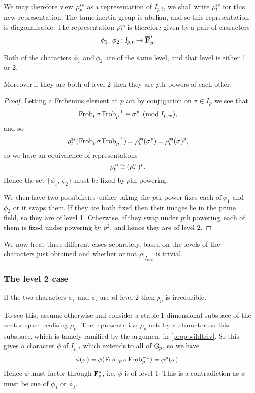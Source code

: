 \documentclass[a4paper,12pt]{article}
\begin{document}
We may therefore view $\rho^\text{ss}_p$ as a representation of $I_{p,t}$, we shall write $\rho^\text{ss}_t$ for this new representation.
The tame inertia group is abelian, and so this representation is diagonalisable.
The representation $\rho^\text{ss}_t$ is therefore given by a pair of characters
\[
\phi_1,\,\phi_2\colon I_{p,t} \to \overline{\mathbf{F}}_p^*.
\]

\begin{prop}
Both of the characters $\phi_1$ and $\phi_2$ are of the same level, and that level is either 1 or 2.

Moreover if they are both of level 2 then they are $p$th powers of each other.
\end{prop}
\begin{proof}
Letting a Frobenius element at $p$ act by conjugation on $\sigma\in I_{p}$ we see that
\[
\operatorname{Frob}_p \sigma \operatorname{Frob}_p^{-1} \equiv \sigma^p \pmod{I_{p,w}},
\]
and so
\[
\rho^\text{ss}_t( \operatorname{Frob}_p\sigma \operatorname{Frob}_p^{-1}) = \rho^\text{ss}_t(\sigma^p) = \rho^\text{ss}_t(\sigma)^p,
\]
so we have an equivalence of representations
\[
\rho^\text{ss}_t \cong (\rho^\text{ss}_t)^p.
\]
Hence the set $\{\phi_1,\,\phi_2\}$ must be fixed by $p$th powering.

We then have two possibilities, either taking the $p$th power fixes each of $\phi_1$ and $\phi_2$ or it swaps them.
If they are both fixed then their images lie in the prime field, so they are of level 1.
Otherwise, if they swap under $p$th powering, each of them is fixed under powering by $p^2$, and hence they are of level 2.
\end{proof}

We now treat three different cases separately, based on the levels of the characters just obtained and whether or not $\rho|_{I_{p,w}}$ is trivial.


\subsubsection{The level 2 case}\label{sec:l2}
If the two characters $\phi_1$ and $\phi_2$ are of level 2 then $\rho_p$ is irreducible.

To see this, assume otherwise and consider a stable 1-dimensional subspace of the vector space realising $\rho_p$.
The representation $\rho_p$ acts by a character on this subspace, which is tamely ramified by the argument in \cref{prop:wildtriv}.
So this gives a character $\phi$ of $I_{p,t}$ which extends to all of $\mathrm{G}_p$, so we have
\[
\phi(\sigma) = \phi(\operatorname{Frob}_p\sigma\operatorname{Frob}_p^{-1}) = \phi^p(\sigma).
\]
Hence $\phi$ must factor through $\mathbf{F}_p^*$, i.e. $\phi$ is of level 1.
This is a contradiction as $\phi$ must be one of $\phi_1$ or $\phi_2$.
\end{document}
